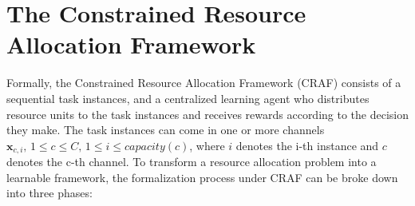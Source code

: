 \documentclass[conference]{IEEEtran}
\begin{document}

\section{The Constrained Resource Allocation Framework}

Formally, the Constrained Resource Allocation Framework (CRAF) consists of a sequential task instances, and a centralized learning agent who distributes resource units to the task instances and receives rewards according to the decision they make. The task instances can come in one or more channels $\mathbf{x}_{c,i},\, 1\leq c \leq C,\, 1\leq i \leq capacity(c)$, where $i$ denotes the i-th instance and $c$ denotes the c-th channel. To transform a resource allocation problem into a learnable framework, the formalization process under CRAF can be broke down into three phases:
\end{document}
